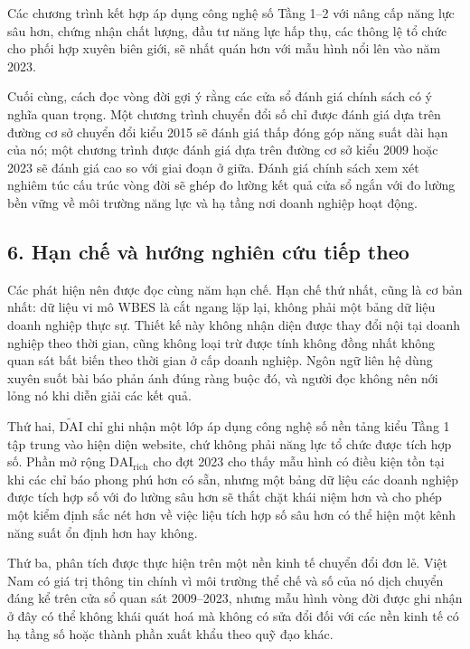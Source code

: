 \documentclass[12pt,a4paper]{article}
\begin{document}
Các chương trình kết hợp áp dụng công nghệ số Tầng 1--2 với nâng cấp
năng lực sâu hơn, chứng nhận chất lượng, đầu tư năng lực hấp thụ, các
thông lệ tổ chức cho phối hợp xuyên biên giới, sẽ nhất quán hơn với mẫu
hình nổi lên vào năm 2023.

Cuối cùng, cách đọc vòng đời gợi ý rằng các cửa sổ đánh giá chính sách
có ý nghĩa quan trọng. Một chương trình chuyển đổi số chỉ được đánh giá
dựa trên đường cơ sở chuyển đổi kiểu 2015 sẽ đánh giá thấp đóng góp năng
suất dài hạn của nó; một chương trình được đánh giá dựa trên đường cơ sở
kiểu 2009 hoặc 2023 sẽ đánh giá cao so với giai đoạn ở giữa. Đánh giá
chính sách xem xét nghiêm túc cấu trúc vòng đời sẽ ghép đo lường kết quả
cửa sổ ngắn với đo lường bền vững về môi trường năng lực và hạ tầng nơi
doanh nghiệp hoạt động.

\hypertarget{6-hux1ea1n-chux1ebf-vuxe0-hux1b0ux1edbng-nghiuxean-cux1ee9u-tiux1ebfp-theo}{%
\subsection{6. Hạn chế và hướng nghiên cứu tiếp
theo}\label{6-hux1ea1n-chux1ebf-vuxe0-hux1b0ux1edbng-nghiuxean-cux1ee9u-tiux1ebfp-theo}}

Các phát hiện nên được đọc cùng năm hạn chế. Hạn chế thứ nhất, cũng là
cơ bản nhất: dữ liệu vi mô WBES là cắt ngang lặp lại, không phải một
bảng dữ liệu doanh nghiệp thực sự. Thiết kế này không nhận diện được
thay đổi nội tại doanh nghiệp theo thời gian, cũng không loại trừ được
tính không đồng nhất không quan sát bất biến theo thời gian ở cấp doanh
nghiệp. Ngôn ngữ liên hệ dùng xuyên suốt bài báo phản ánh đúng ràng buộc
đó, và người đọc không nên nới lỏng nó khi diễn giải các kết quả.

Thứ hai, \(\tilde{\mathrm{DAI}}\) chỉ ghi nhận một lớp áp dụng công nghệ
số nền tảng kiểu Tầng 1 tập trung vào hiện diện website, chứ không phải
năng lực tổ chức được tích hợp số. Phần mở rộng
\(\mathrm{DAI}_{\text{rich}}\) cho đợt 2023 cho thấy mẫu hình có điều
kiện tồn tại khi các chỉ báo phong phú hơn có sẵn, nhưng một bảng dữ
liệu các doanh nghiệp được tích hợp số với đo lường sâu hơn sẽ thắt chặt
khái niệm hơn và cho phép một kiểm định sắc nét hơn về việc liệu tích
hợp số sâu hơn có thể hiện một kênh năng suất ổn định hơn hay không.

Thứ ba, phân tích được thực hiện trên một nền kinh tế chuyển đổi đơn lẻ.
Việt Nam có giá trị thông tin chính vì môi trường thể chế và số của nó
dịch chuyển đáng kể trên cửa sổ quan sát 2009--2023, nhưng mẫu hình vòng
đời được ghi nhận ở đây có thể không khái quát hoá mà không có sửa đổi
đối với các nền kinh tế có hạ tầng số hoặc thành phần xuất khẩu theo quỹ
đạo khác.
\end{document}
